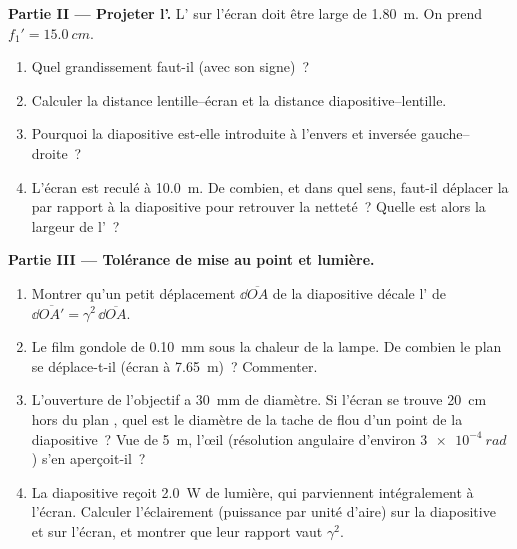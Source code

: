\begin{problem}
\medskip
\noindent\textbf{Partie II --- Projeter l'.}
L' sur l'écran doit être large de \qty{1.80}{m}. On prend
$f_1' = \qty{15.0}{cm}$.
\begin{enumerate}[resume]
  \item Quel grandissement faut-il (avec son signe)~?
  \item Calculer la distance lentille--écran et la distance
        diapositive--lentille.
  \item Pourquoi la diapositive est-elle introduite à l'envers et
        inversée gauche--droite~?
  \item L'écran est reculé à \qty{10.0}{m}. De combien, et dans quel
        sens, faut-il déplacer la  par rapport à la diapositive
        pour retrouver la netteté~? Quelle est alors la largeur de
        l'~?
\end{enumerate}

\medskip
\noindent\textbf{Partie III --- Tolérance de mise au point et lumière.}
\begin{enumerate}[resume]
  \item Montrer qu'un petit déplacement $\dd\overline{OA}$ de la
        diapositive décale l' de $\dd\overline{OA'} = \gamma^2\,\dd\overline{OA}$.
  \item Le film gondole de \qty{0.10}{mm} sous la chaleur de la lampe.
        De combien le plan  se déplace-t-il (écran à
        \qty{7.65}{m})~? Commenter.
  \item L'ouverture de l'objectif a \qty{30}{mm} de diamètre. Si l'écran
        se trouve \qty{20}{cm} hors du plan , quel est le diamètre
        de la tache de flou d'un point de la diapositive~? Vue de
        \qty{5}{m}, l'œil (résolution angulaire d'environ $\qty{3e-4}{rad}$)
        s'en aperçoit-il~?
  \item La diapositive reçoit \qty{2.0}{W} de lumière, qui parviennent
        intégralement à l'écran. Calculer l'éclairement (puissance par
        unité d'aire) sur la diapositive et sur l'écran, et montrer que
        leur rapport vaut $\gamma^2$.
\end{enumerate}


\end{problem}
